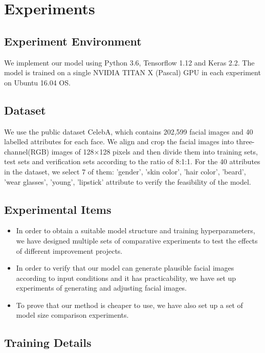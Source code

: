 \section{Experiments}

\subsection{Experiment Environment}
We implement our model using Python 3.6, Tensorflow 1.12 and Keras 2.2.
The model is trained on a single NVIDIA TITAN X (Pascal) GPU in each experiment on Ubuntu 16.04 OS.


\subsection{Dataset}
We use the public dataset CelebA, which contains 202,599 facial images and 40 labelled attributes for each face.
We align and crop the facial images into three-channel(RGB) images of 128×128 pixels and then divide them into training sets, test sets and verification sets according to the ratio of 8:1:1.
For the 40 attributes in the dataset, we select 7 of them: 'gender', 'skin color', 'hair color', 'beard', 'wear glasses', 'young', 'lipstick' attribute to verify the feasibility of the model.

\subsection{Experimental Items}
\begin{itemize}
\item In order to obtain a suitable model structure and training hyperparameters, we have designed multiple sets of comparative experiments to test the effects of different improvement projects.
\item In order to verify that our model can generate plausible facial images according to input conditions and it has practicability, we have set up experiments of generating and adjusting facial images.
\item To prove that our method is cheaper to use, we have also set up a set of model size comparison experiments.
\end{itemize}

\subsection{Training Details}

